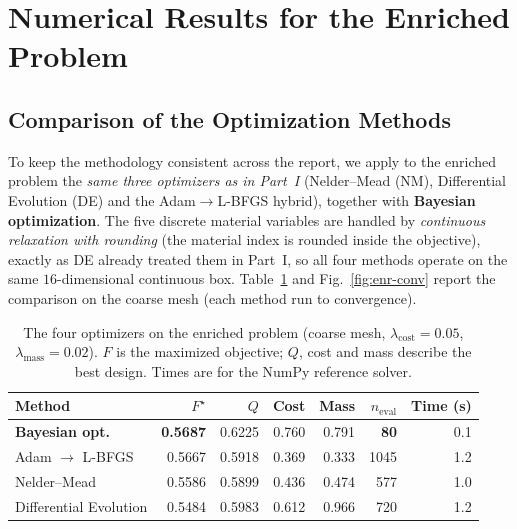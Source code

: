 \documentclass[11pt,a4paper]{article}
\begin{document}
\section{Numerical Results for the Enriched Problem}

\subsection{Comparison of the Optimization Methods}
To keep the methodology consistent across the report, we apply to the enriched problem the
\emph{same three optimizers as in Part~I} (Nelder--Mead (NM), Differential Evolution (DE) and the
Adam$\rightarrow$L-BFGS hybrid), together with \textbf{Bayesian optimization}. The five discrete material
variables are handled by \emph{continuous relaxation with rounding} (the material index is rounded inside
the objective), exactly as DE already treated them in Part~I, so all four methods operate on the
same $16$-dimensional continuous box.
Table~\ref{tab:enr-methods} and Fig.~\ref{fig:enr-conv} report the comparison on the coarse mesh (each method run to convergence).

\begin{table}[h]
\centering
\caption{The four optimizers on the enriched problem (coarse mesh, $\lambda_{\text{cost}}=0.05$,
$\lambda_{\text{mass}}=0.02$). $F$ is the maximized objective; $Q$, cost and mass describe the best
design. Times are for the NumPy reference solver.}
\label{tab:enr-methods}
\begin{tabular}{lrrrrrr}
\toprule
Method & $F^\star$ & $Q$ & Cost & Mass & $n_{\text{eval}}$ & Time (s)\\
\midrule
\textbf{Bayesian opt.} & \textbf{0.5687} & 0.6225 & 0.760 & 0.791 & \textbf{80} & 0.1\\
Adam $\rightarrow$ L-BFGS & 0.5667 & 0.5918 & 0.369 & 0.333 & 1045 & 1.2\\
Nelder--Mead & 0.5586 & 0.5899 & 0.436 & 0.474 & 577 & 1.0\\
Differential Evolution & 0.5484 & 0.5983 & 0.612 & 0.966 & 720 & 1.2\\
\bottomrule
\end{tabular}
\end{table}
\end{document}
